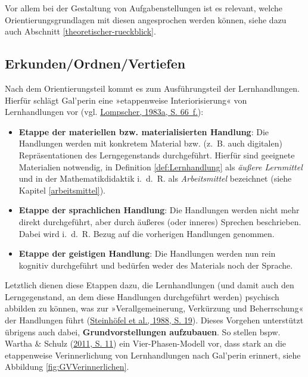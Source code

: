 \documentclass[
]{scrbook}
\theoremstyle{definition}
\theoremstyle{definition}
\theoremstyle{definition}
\theoremstyle{definition}
\theoremstyle{remark}
\begin{document}
Vor allem bei der Gestaltung von Aufgabenstellungen ist es relevant, welche Orientierungsgrundlagen mit diesen angesprochen werden können, siehe dazu auch Abschnitt \ref{theoretischer-rueckblick}.

\hypertarget{erkunden-ordnen-vertiefen}{%
\subsection{Erkunden/Ordnen/Vertiefen}\label{erkunden-ordnen-vertiefen}}

Nach dem Orientierungsteil kommt es zum Ausführungsteil der Lernhandlungen. Hierfür schlägt Gal'perin eine »etappenweise Interiorisierung« von Lernhandlungen vor (vgl. \protect\hyperlink{ref-Lompscher1983a}{Lompscher, 1983a, S. 66~f.}):

\begin{itemize}
\item
  \textbf{Etappe der materiellen bzw. materialisierten Handlung}: Die Handlungen werden mit konkretem Material bzw. (z.~B. auch digitalen) Repräsentationen des Lerngegenstands durchgeführt. Hierfür sind geeignete Materialien notwendig, in Definition \ref{def:Lernhandlung} als \emph{äußere Lernmittel} und in der Mathematikdidaktik i.~d.~R. als \emph{Arbeitsmittel} bezeichnet (siehe Kapitel \ref{arbeitsmittel}).
\item
  \textbf{Etappe der sprachlichen Handlung}: Die Handlungen werden nicht mehr direkt durchgeführt, aber durch äußeres (oder inneres) Sprechen beschrieben. Dabei wird i.~d.~R. Bezug auf die vorherigen Handlungen genommen.
\item
  \textbf{Etappe der geistigen Handlung}: Die Handlungen werden nun rein kognitiv durchgeführt und bedürfen weder des Materials noch der Sprache.
\end{itemize}

Letztlich dienen diese Etappen dazu, die Lernhandlungen (und damit auch den Lerngegenstand, an dem diese Handlungen durchgeführt werden) psychisch abbilden zu können, was zur »Verallgemeinerung, Verkürzung und Beherrschung« der Handlungen führt (\protect\hyperlink{ref-Steinhofel1988}{Steinhöfel et al., 1988, S. 19}). Dieses Vorgehen unterstützt übrigens auch dabei, \textbf{Grundvorstellungen aufzubauen}. So stellen bspw. Wartha \& Schulz (\protect\hyperlink{ref-Wartha2011}{2011, S. 11}) ein Vier-Phasen-Modell vor, dass stark an die etappenweise Verinnerlichung von Lernhandlungen nach Gal'perin erinnert, siehe Abbildung \ref{fig:GVVerinnerlichen}.
\end{document}
